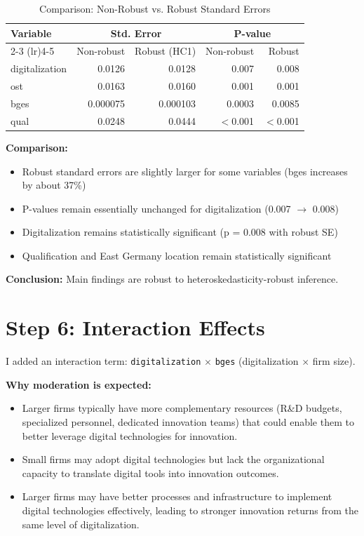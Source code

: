 \documentclass[a4paper,12pt]{article}
\begin{document}
\begin{table}[H]
\centering
\caption{Comparison: Non-Robust vs. Robust Standard Errors}
\begin{tabular}{lrrrr}
\toprule
Variable & \multicolumn{2}{c}{Std. Error} & \multicolumn{2}{c}{P-value} \\
\cmidrule(lr){2-3} \cmidrule(lr){4-5}
 & Non-robust & Robust (HC1) & Non-robust & Robust \\
\midrule
digitalization & 0.0126 & 0.0128 & 0.007 & 0.008 \\
ost & 0.0163 & 0.0160 & 0.001 & 0.001 \\
bges & 0.000075 & 0.000103 & 0.0003 & 0.0085 \\
qual & 0.0248 & 0.0444 & $<$0.001 & $<$0.001 \\
\bottomrule
\end{tabular}
\end{table}

\textbf{Comparison:}
\begin{itemize}
    \item Robust standard errors are slightly larger for some variables (bges increases by about 37\%)
    \item P-values remain essentially unchanged for digitalization (0.007 $\rightarrow$ 0.008)
    \item Digitalization remains statistically significant (p = 0.008 with robust SE)
    \item Qualification and East Germany location remain statistically significant
\end{itemize}

\textbf{Conclusion:} Main findings are robust to heteroskedasticity-robust inference.

\section*{Step 6: Interaction Effects}

I added an interaction term: \texttt{digitalization} $\times$ \texttt{bges} (digitalization $\times$ firm size).

\textbf{Why moderation is expected:}
\begin{itemize}
    \item Larger firms typically have more complementary resources (R\&D budgets, specialized personnel, dedicated innovation teams) that could enable them to better leverage digital technologies for innovation.
    
    \item Small firms may adopt digital technologies but lack the organizational capacity to translate digital tools into innovation outcomes.
    
    \item Larger firms may have better processes and infrastructure to implement digital technologies effectively, leading to stronger innovation returns from the same level of digitalization.
\end{itemize}
\end{document}

